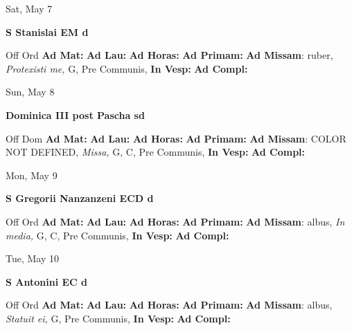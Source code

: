 \documentclass[10pt]{memoir}
\begin{document}
\begin{center}
\begin{minipage}{3.5in}
\vspace{2em}
\begin{center}Sat, May 7
\end{center}
\textbf{ \large S Stanislai EM
\textnormal{\normalsize d}}

\begin{justify}Off Ord
\textbf{Ad Mat: }
\textbf{Ad Lau: }
\textbf{Ad Horas: }
\textbf{Ad Primam: }\textbf{Ad Missam}: ruber, \textit{Protexisti me,} G, Pre Communis, 
\textbf{In Vesp: }
\textbf{Ad Compl: }
\end{justify}
\end{minipage}
\end{center}

\begin{center}
\begin{minipage}{3.5in}
\vspace{2em}
\begin{center}Sun, May 8
\end{center}
\textbf{ \large Dominica III post Pascha
\textnormal{\normalsize sd}}

\begin{justify}Off Dom
\textbf{Ad Mat: }
\textbf{Ad Lau: }
\textbf{Ad Horas: }
\textbf{Ad Primam: }\textbf{Ad Missam}: COLOR NOT DEFINED, \textit{Missa,} G, C, Pre Communis, 
\textbf{In Vesp: }
\textbf{Ad Compl: }
\end{justify}
\end{minipage}
\end{center}

\begin{center}
\begin{minipage}{3.5in}
\vspace{2em}
\begin{center}Mon, May 9
\end{center}
\textbf{ \large S Gregorii Nanzanzeni ECD
\textnormal{\normalsize d}}

\begin{justify}Off Ord
\textbf{Ad Mat: }
\textbf{Ad Lau: }
\textbf{Ad Horas: }
\textbf{Ad Primam: }\textbf{Ad Missam}: albus, \textit{In media,} G, C, Pre Communis, 
\textbf{In Vesp: }
\textbf{Ad Compl: }
\end{justify}
\end{minipage}
\end{center}

\begin{center}
\begin{minipage}{3.5in}
\vspace{2em}
\begin{center}Tue, May 10
\end{center}
\textbf{ \large S Antonini EC
\textnormal{\normalsize d}}

\begin{justify}Off Ord
\textbf{Ad Mat: }
\textbf{Ad Lau: }
\textbf{Ad Horas: }
\textbf{Ad Primam: }\textbf{Ad Missam}: albus, \textit{Statuit ei,} G, Pre Communis, 
\textbf{In Vesp: }
\textbf{Ad Compl: }
\end{justify}
\end{minipage}
\end{center}
\end{document}
